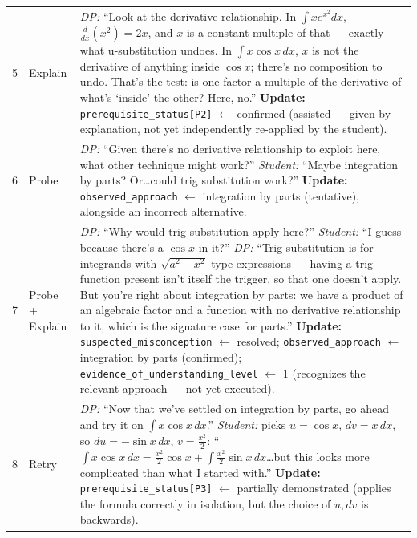 \documentclass[11pt]{article}
\begin{document}
\begin{longtable}{P{1.0cm} P{2.1cm} P{12.4cm}}
5 & Explain &
  \textit{DP:} ``Look at the derivative relationship. In
  $\int x e^{x^2}dx$, $\frac{d}{dx}(x^2)=2x$, and $x$ is a constant
  multiple of that --- exactly what u-substitution undoes. In
  $\int x\cos x\,dx$, $x$ is not the derivative of anything inside
  $\cos x$; there's no composition to undo. That's the test: is one
  factor a multiple of the derivative of what's `inside' the other?
  Here, no.'' \newline
  \textbf{Update:} \texttt{prerequisite\_status[P2]} $\leftarrow$
  confirmed (assisted --- given by explanation, not yet independently
  re-applied by the student). \\[2mm]

6 & Probe &
  \textit{DP:} ``Given there's no derivative relationship to exploit
  here, what other technique might work?'' \newline
  \textit{Student:} ``Maybe integration by parts? Or\ldots could trig
  substitution work?'' \newline
  \textbf{Update:} \texttt{observed\_approach} $\leftarrow$
  integration by parts (tentative), alongside an incorrect alternative. \\[2mm]

7 & Probe + Explain &
  \textit{DP:} ``Why would trig substitution apply here?'' \newline
  \textit{Student:} ``I guess because there's a $\cos x$ in it?''
  \newline
  \textit{DP:} ``Trig substitution is for integrands with
  $\sqrt{a^2-x^2}$-type expressions --- having a trig function present
  isn't itself the trigger, so that one doesn't apply. But you're right
  about integration by parts: we have a product of an algebraic factor
  and a function with no derivative relationship to it, which is the
  signature case for parts.'' \newline
  \textbf{Update:} \texttt{suspected\_misconception} $\leftarrow$
  resolved; \texttt{observed\_approach} $\leftarrow$ integration by
  parts (confirmed); \texttt{evidence\_of\_understanding\_level}
  $\leftarrow$ 1 (recognizes the relevant approach --- not yet
  executed). \\[2mm]

8 & Retry &
  \textit{DP:} ``Now that we've settled on integration by parts, go
  ahead and try it on $\int x\cos x\,dx$.'' \newline
  \textit{Student:} picks $u=\cos x$, $dv=x\,dx$, so $du=-\sin x\,dx$,
  $v=\tfrac{x^2}{2}$: ``$\int x\cos x\,dx = \tfrac{x^2}{2}\cos x +
  \int \tfrac{x^2}{2}\sin x\,dx$\ldots but this looks more complicated
  than what I started with.'' \newline
  \textbf{Update:} \texttt{prerequisite\_status[P3]} $\leftarrow$
  partially demonstrated (applies the formula correctly in isolation,
  but the choice of $u,dv$ is backwards). \\[2mm]


\end{longtable}
\end{document}
